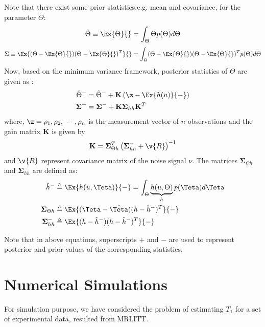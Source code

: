 \documentclass[3p,times]{article}
\begin{document}
Note that there exist some prior statistics,e.g. mean and covariance, for the parameter $\Theta$:
\begin{equation}\label{mean}
\hat{\Theta}\equiv\Ex{\Theta}{}=\int_{\Theta} \Theta p(\Theta)d\Theta
\end{equation}
\begin{equation}\label{covar}
\Sigma\equiv\Ex{(\Theta-\Ex{\Theta}{})(\Theta-\Ex{\Theta}{})^T}{}=\int_{\Theta} (\Theta-\Ex{\Theta}{})(\Theta-\Ex{\Theta}{})^T p(\Theta)d\Theta
\end{equation}
Now, based on the minimum variance framework, posterior statistics of $\Theta$ are given as \cite{Madankan_jcp,madankan_jgcd}:
\begin{align}
\hat{\Theta}^+&=\hat{\Theta}^- + \mathbf{K}\left(\z-\Ex{h(u)}{-}\right)\label{minvar_mean}\\
\boldsymbol{\Sigma}^+& = \boldsymbol{\Sigma}^- + \mathbf{K} \boldsymbol{\Sigma}_{hh}\mathbf{K}^T\label{minvar_var}
\end{align}
where, $\z={\rho_1,\rho_2, \cdots, \rho_n}$ is the measurement vector of $n$ observations and the gain matrix $\mathbf{K}$ is given by
\begin{equation}
\mathbf{K} = \boldsymbol{\Sigma}_{\Theta h}^T\left(\boldsymbol{\Sigma}_{hh}^-+\v{R}\right)^{-1}\label{Kgain}
\end{equation}
and $\v{R}$ represent covariance matrix of the noise signal $\nu$. The matrices $\boldsymbol{\Sigma}_{\Theta h}$ and $\boldsymbol{\Sigma}_{hh}$ are defined as:
\begin{align}
\hat{h}^-&\triangleq \Ex{h(u,\Teta)}{-}=\int_{\Theta}\underbrace{h(u,\Theta)}_{h}p(\Teta)d\Teta\label{h_k}\\
\boldsymbol{\Sigma}_{\Theta h} & \triangleq\Ex{(\Teta-\hat{\Teta})(h-\hat{h}^-)^T}{-}\label{Pzy}\\
\boldsymbol{\Sigma}_{hh}^- &\triangleq \Ex{(h-\hat{h}^-)(h-\hat{h}^-)^T}{-}\label{Pzz}
\end{align}

Note that in above equations, superscripts $+$ and $-$ are used to represent posterior and prior values of the corresponding statistics.

\section*{Numerical Simulations}\label{sec:sim}
For simulation purpose, we have considered the problem of estimating $T_1$ for a set of experimental data, resulted from MRLITT.
\end{document}
